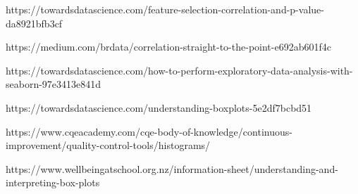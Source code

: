 \documentclass[12pt]{extreport}
\begin{document}
\newpage
\begin{thebibliography}{100} %
\bibitem{} https://towardsdatascience.com/feature-selection-correlation-and-p-value-da8921bfb3cf

\bibitem{}https://medium.com/brdata/correlation-straight-to-the-point-e692ab601f4c

\bibitem{} https://towardsdatascience.com/how-to-perform-exploratory-data-analysis-with-seaborn-97e3413e841d

\bibitem{} 
https://towardsdatascience.com/understanding-boxplots-5e2df7bcbd51

\bibitem{} 
https://www.cqeacademy.com/cqe-body-of-knowledge/continuous-improvement/quality-control-tools/histograms/

\bibitem{} 
https://www.wellbeingatschool.org.nz/information-sheet/understanding-and-interpreting-box-plots







\end{thebibliography}
 
\end{document}
